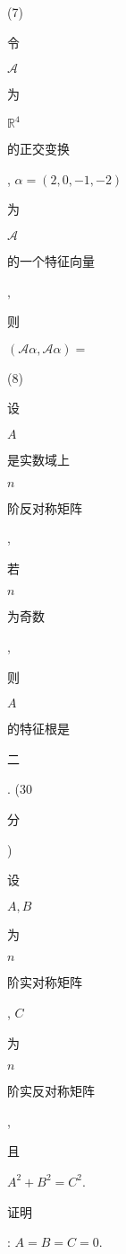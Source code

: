 \documentclass[10pt]{article}
\begin{document}
(7) \begin{CJK}{UTF8}{mj}令\end{CJK} $\mathscr{A}$ \begin{CJK}{UTF8}{mj}为\end{CJK} $\mathbb{R}^{4}$ \begin{CJK}{UTF8}{mj}的正交变换\end{CJK}, $\alpha=(2,0,-1,-2)$ \begin{CJK}{UTF8}{mj}为\end{CJK} $\mathscr{A}$ \begin{CJK}{UTF8}{mj}的一个特征向量\end{CJK}, \begin{CJK}{UTF8}{mj}则\end{CJK} $(\mathscr{A} \alpha, \mathscr{A} \alpha)=$

(8) \begin{CJK}{UTF8}{mj}设\end{CJK} $A$ \begin{CJK}{UTF8}{mj}是实数域上\end{CJK} $n$ \begin{CJK}{UTF8}{mj}阶反对称矩阵\end{CJK}, \begin{CJK}{UTF8}{mj}若\end{CJK} $n$ \begin{CJK}{UTF8}{mj}为奇数\end{CJK}, \begin{CJK}{UTF8}{mj}则\end{CJK} $A$ \begin{CJK}{UTF8}{mj}的特征根是\end{CJK}

\begin{CJK}{UTF8}{mj}二\end{CJK}. (30 \begin{CJK}{UTF8}{mj}分\end{CJK}) \begin{CJK}{UTF8}{mj}设\end{CJK} $A, B$ \begin{CJK}{UTF8}{mj}为\end{CJK} $n$ \begin{CJK}{UTF8}{mj}阶实对称矩阵\end{CJK}, $C$ \begin{CJK}{UTF8}{mj}为\end{CJK} $n$ \begin{CJK}{UTF8}{mj}阶实反对称矩阵\end{CJK}, \begin{CJK}{UTF8}{mj}且\end{CJK} $A^{2}+B^{2}=C^{2}$. \begin{CJK}{UTF8}{mj}证明\end{CJK}: $A=B=C=0$.
\end{document}

